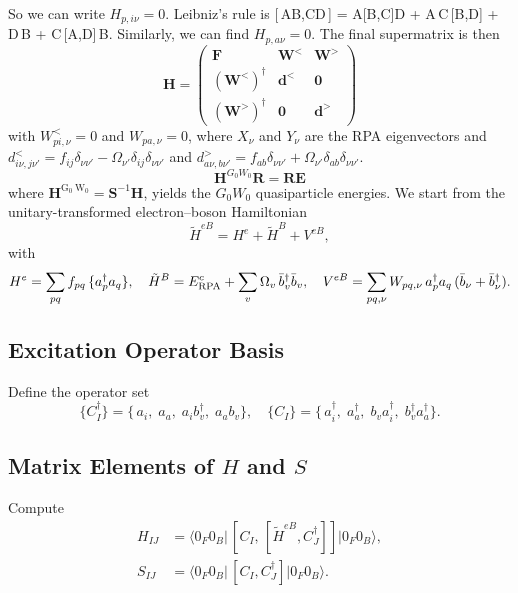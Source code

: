 So we can write $H_{p,i \nu} = 0$.
Leibniz's rule is 
[\,AB,CD\,]
= A[B,C]D \;+\; A\,C\,[B,D] \;+\; [A,C]\,D\,B \;+\; C\,[A,D]\,B.
 Similarly, we can find $H_{p,a \nu} = 0$. The final supermatrix is then
\begin{equation}
\bm{H} = \begin{pmatrix}
    \bm{F} & \bm{W}^< & \bm{W}^> \\
    (\bm{W}^<)^\dagger & \bm{d}^< & \bm{0} \\
    (\bm{W}^>)^\dagger & \bm{0} & \bm{d}^>
\end{pmatrix}
\end{equation}
with $W_{p i, \nu}^< = 0$ and $W_{p a, \nu} = 0$, where $X_{\nu}$ and $Y_{\nu}$ are the RPA eigenvectors and $d^<_{i \nu, j \nu'} = f_{i j} \delta_{\nu \nu'} - \Omega_{\nu'} \delta_{i j} \delta_{\nu \nu'}$ and $d^>_{a \nu, b \nu'} = f_{a b} \delta_{\nu \nu'} + \Omega_{\nu'} \delta_{a b} \delta_{\nu \nu'}$.
$$
\mathbf{H}^{G_0 W_0} \mathbf{R}=\mathbf{R} \mathbf{E}
$$
where $\mathbf{H}^{\mathrm{G}_0 \mathrm{~W}_0}=\mathbf{S}^{-1} \mathbf{H}$, yields the $G_0 W_0$ quasiparticle energies. 
We start from the unitary-transformed electron–boson Hamiltonian
\[
\tilde H^{eB}=H^e+\tilde H^B+V^{eB},
\]
with
\[
H^e=\sum_{pq}f_{pq}\,\{a_p^\dagger a_q\},
\quad
\tilde H^B=E^c_{\rm RPA}+\sum_v\Omega_v\,\bar b_v^\dagger\bar b_v,
\quad
V^{eB}=\sum_{pq,\nu}W_{pq,\nu}\,a_p^\dagger a_q\,(\bar b_\nu+\bar b_\nu^\dagger).
\]

\subsection*{Excitation Operator Basis}
Define the operator set
\[
\{C_I^\dagger\}=
\{\,a_i,\;a_a,\;a_i b_v^\dagger,\;a_a b_v\},
\quad
\{C_I\}=
\{\,a_i^\dagger,\;a_a^\dagger,\;b_v a_i^\dagger,\;b_v^\dagger a_a^\dagger\}.
\]

\subsection*{Matrix Elements of $H$ and $S$}
Compute
\begin{align*}
H_{IJ}&=\bigl\langle0_F0_B\bigl|\,[C_I,\,[\tilde H^{eB},C_J^\dagger]]\bigr|0_F0_B\bigr\rangle,\\
S_{IJ}&=\bigl\langle0_F0_B\bigl|\,[C_I,C_J^\dagger]\bigr|0_F0_B\bigr\rangle.
\end{align*}

